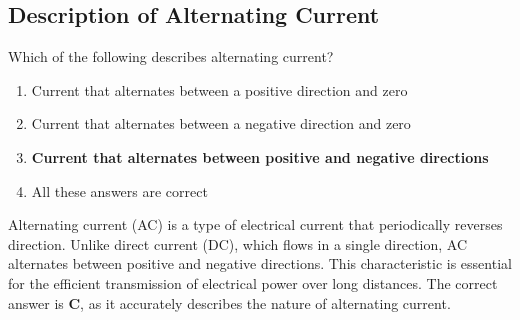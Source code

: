 \subsection{Description of Alternating Current}
\label{T5A09}

\begin{tcolorbox}[colback=gray!10!white,colframe=black!75!black,title=T5A09]
Which of the following describes alternating current?
\begin{enumerate}[noitemsep]
    \item Current that alternates between a positive direction and zero
    \item Current that alternates between a negative direction and zero
    \item \textbf{Current that alternates between positive and negative directions}
    \item All these answers are correct
\end{enumerate}
\end{tcolorbox}

Alternating current (AC) is a type of electrical current that periodically reverses direction. Unlike direct current (DC), which flows in a single direction, AC alternates between positive and negative directions. This characteristic is essential for the efficient transmission of electrical power over long distances. The correct answer is \textbf{C}, as it accurately describes the nature of alternating current.